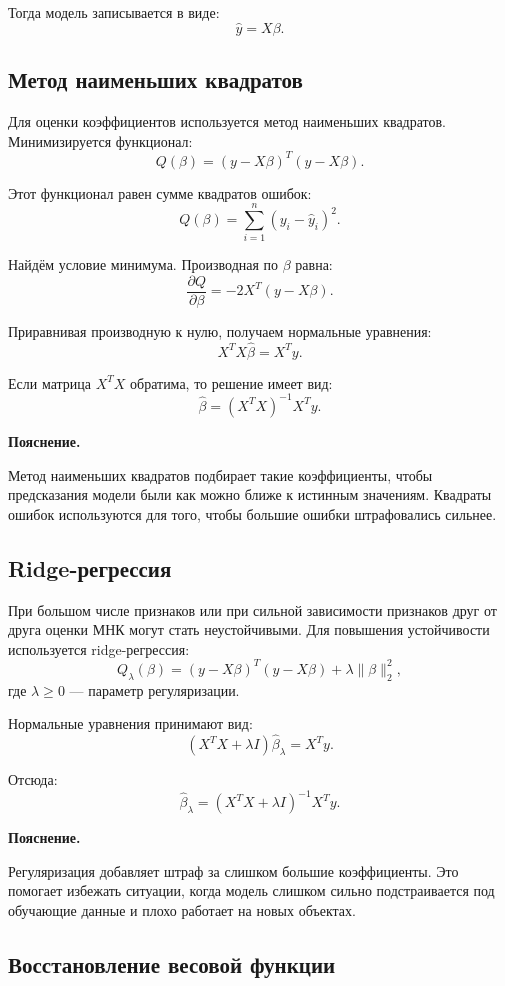\documentclass[14pt,a4paper]{extarticle}
\newenvironment{explanation}
{
    \vspace{0.2cm}
    \noindent\textbf{Пояснение.}
}
{
    \vspace{0.2cm}
}
\begin{document}
Тогда модель записывается в виде:
\[
\hat y=X\beta.
\]

\subsection{Метод наименьших квадратов}

Для оценки коэффициентов используется метод наименьших квадратов. Минимизируется функционал:
\[
Q(\beta)=(y-X\beta)^T(y-X\beta).
\]

Этот функционал равен сумме квадратов ошибок:
\[
Q(\beta)=\sum_{i=1}^{n}(y_i-\hat y_i)^2.
\]

Найдём условие минимума. Производная по \(\beta\) равна:
\[
\frac{\partial Q}{\partial \beta}
=
-2X^T(y-X\beta).
\]

Приравнивая производную к нулю, получаем нормальные уравнения:
\[
X^TX\hat\beta=X^Ty.
\]

Если матрица \(X^TX\) обратима, то решение имеет вид:
\[
\hat\beta=(X^TX)^{-1}X^Ty.
\]

\begin{explanation}
Метод наименьших квадратов подбирает такие коэффициенты, чтобы предсказания модели были как можно ближе к истинным значениям. Квадраты ошибок используются для того, чтобы большие ошибки штрафовались сильнее.
\end{explanation}

\subsection{Ridge-регрессия}

При большом числе признаков или при сильной зависимости признаков друг от друга оценки МНК могут стать неустойчивыми. Для повышения устойчивости используется ridge-регрессия:
\[
Q_{\lambda}(\beta)
=
(y-X\beta)^T(y-X\beta)+\lambda\|\beta\|_2^2,
\]
где \(\lambda \geq 0\) — параметр регуляризации.

Нормальные уравнения принимают вид:
\[
(X^TX+\lambda I)\hat\beta_{\lambda}=X^Ty.
\]

Отсюда:
\[
\hat\beta_{\lambda}
=
(X^TX+\lambda I)^{-1}X^Ty.
\]

\begin{explanation}
Регуляризация добавляет штраф за слишком большие коэффициенты. Это помогает избежать ситуации, когда модель слишком сильно подстраивается под обучающие данные и плохо работает на новых объектах.
\end{explanation}

\subsection{Восстановление весовой функции}
\end{document}

